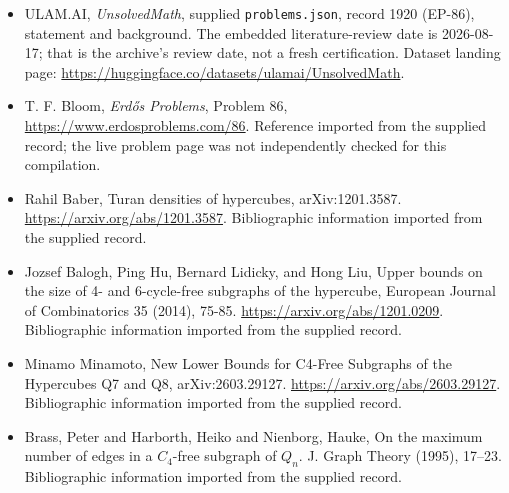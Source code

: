 \documentclass[11pt,a4paper]{article}
\begin{document}
{\small

\begin{itemize}

\item[\hypertarget{source:1920:1}{S1}] ULAM.AI, \emph{UnsolvedMath}, supplied \texttt{problems.json}, record 1920 (EP-86), statement and background. The embedded literature-review date is 2026-08-17; that is the archive’s review date, not a fresh certification. Dataset landing page: \url{https://huggingface.co/datasets/ulamai/UnsolvedMath}.

\item[\hypertarget{source:1920:2}{S2}] T. F. Bloom, \emph{Erdős Problems}, Problem 86, \url{https://www.erdosproblems.com/86}. Reference imported from the supplied record; the live problem page was not independently checked for this compilation.

\item[\hypertarget{source:1920:3}{S3}] Rahil Baber, Turan densities of hypercubes, arXiv:1201.3587. \url{https://arxiv.org/abs/1201.3587}. Bibliographic information imported from the supplied record.

\item[\hypertarget{source:1920:4}{S4}] Jozsef Balogh, Ping Hu, Bernard Lidicky, and Hong Liu, Upper bounds on the size of 4- and 6-cycle-free subgraphs of the hypercube, European Journal of Combinatorics 35 (2014), 75-85. \url{https://arxiv.org/abs/1201.0209}. Bibliographic information imported from the supplied record.

\item[\hypertarget{source:1920:5}{S5}] Minamo Minamoto, New Lower Bounds for C4-Free Subgraphs of the Hypercubes Q7 and Q8, arXiv:2603.29127. \url{https://arxiv.org/abs/2603.29127}. Bibliographic information imported from the supplied record.

\item[\hypertarget{source:1920:6}{S6}] Brass, Peter and Harborth, Heiko and Nienborg, Hauke, On the maximum number of edges in a {$C_4$}-free subgraph of {$Q_n$}. J. Graph Theory (1995), 17--23. Bibliographic information imported from the supplied record.

\end{itemize}

}

\label{end:1920}
\end{document}
